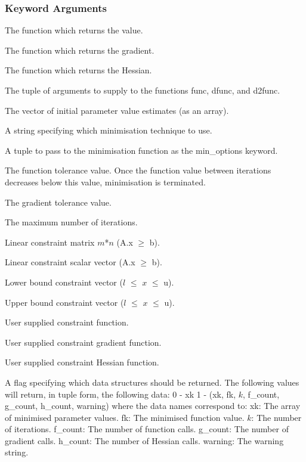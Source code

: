\subsubsection{Keyword Arguments}


  The function which returns the value.

  The function which returns the gradient.

  The function which returns the Hessian.

  The tuple of arguments to supply to the functions func, dfunc, and d2func.

  The vector of initial parameter value estimates (as an array).

  A string specifying which minimisation technique to use.

  A tuple to pass to the minimisation function as the min\_options keyword.

  The function tolerance value.  Once the function value between iterations decreases below this value, minimisation is terminated.

  The gradient tolerance value.

  The maximum number of iterations.

  Linear constraint matrix $m$*$n$ (A.x $\ge$ b).

  Linear constraint scalar vector (A.x $\ge$ b).

  Lower bound constraint vector ($l$ $\le$ $x$ $\le$ u).

  Upper bound constraint vector ($l$ $\le$ $x$ $\le$ u).

  User supplied constraint function.

  User supplied constraint gradient function.

  User supplied constraint Hessian function.

  A flag specifying which data structures should be returned.  The following values will return, in tuple form, the following data: 0 - xk 1 - (xk, fk, $k$, f\_count, g\_count, h\_count, warning) where the data names correspond to: xk:      The array of minimised parameter values. fk:      The minimised function value. $k$:       The number of iterations. f\_count: The number of function calls. g\_count: The number of gradient calls. h\_count: The number of Hessian calls. warning: The warning string.

